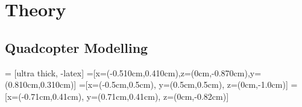 \chapter{Theory}
\label{chap:theo}




\section{Quadcopter Modelling}
\label{sec:theomodel}

 = [ultra thick, -latex]
=[x={(-0.510cm,0.410cm)},z={(0cm,-0.870cm)},y={(0.810cm,0.310cm)}]
=[x={(-0.5cm,0.5cm)}, y={(0.5cm,0.5cm)}, z={(0cm,-1.0cm)}]
=[x={(-0.71cm,0.41cm)}, y={(0.71cm,0.41cm)}, z={(0cm,-0.82cm)}]
%

